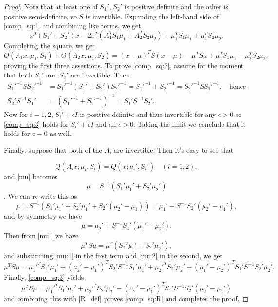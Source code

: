 \documentclass[12pt,leqno]{article}
\begin{document}
\begin{proof}
  Note that at least one of $S_1'$, $S_2'$ is positive definite and the other is positive semi-definite,
so $S$ is invertible.  Expanding the left-hand side of \eqref{comp_sq:1} and combining
like terms, we get
$$
x^T(S_1'+ S_2')x -2x^T(A_1^TS_1\mu_1+ A_2^TS_2\mu_2) 
+ \mu_1^TS_1\mu_1 + \mu_2^TS_2\mu_2.
$$
Completing the square, we get
$$
Q(A_1x;\mu_1,S_1) + Q(A_2x;\mu_2,S_2) = (x-\mu)^TS(x-\mu) -\mu^TS\mu + \mu_1^TS_1\mu_1 + \mu_2^TS_2\mu_2,
$$
proving the first three assertions.
To prove \eqref{comp_sq:3}, assume for the moment that both $S_1'$ and $S_2'$ are invertible.
Then
\begin{align*}
S_1'^{-1}SS_2'^{-1} &= S_1'^{-1}(S_1'+S_2')S_2'^{-1} = S_1'^{-1}+S_2'^{-1} = S_2'^{-1}SS_1'^{-1},\quad\text{hence}\\
S_2'S^{-1}S_1' &= (S_1'^{-1}+S_2'^{-1})^{-1} = S_1'S^{-1}S_2'.
\end{align*}
Now for $i = 1,2$, $S_i'+\epsilon{I}$ is positive definite and thus invertible for any $\epsilon > 0$
so \eqref{comp_sq:3} holds for $S_i'+\epsilon{I}$ and all $\epsilon > 0$.  Taking the limit
we conclude that it holds for $\epsilon = 0$ as well.

Finally, suppose that both of the $A_i$ are invertible. Then it's easy to see that

\begin{equation}\label{comp_sq:4}
Q(A_ix;\mu_i,S_i) = Q(x;\mu_i',S_i')\quad(i = 1,2),
\end{equation}
and \eqref{mu} becomes
\begin{equation} \label{mu'}
\mu = S^{-1}(S_1'\mu_1' + S_2'\mu_2')
\end{equation}.
We can re-write this as
\begin{equation}\label{mu:1}
\mu = S^{-1}(S_1'\mu_1' + S_2'\mu_1' + S_2'(\mu_2'-\mu_1)) = \mu_1' + S^{-1}S_2'(\mu_2'-\mu_1'),
\end{equation}
and by symmetry we have
\begin{equation}\label{mu:2}
  \mu = \mu_2' + S^{-1}S_1'(\mu_1'-\mu_2').
\end{equation}
Then from \eqref{mu'} we have
$$
\mu^TS\mu = \mu^T(S_1'\mu_1' + S_2'\mu_2'),
$$
and substituting \eqref{mu:1} in the first term and \eqref{mu:2} in the second, we get
$$
\mu^TS\mu = \mu_1'^TS_1'\mu_1' + (\mu_2'-\mu_1')^TS_2'S^{-1}S_1'\mu_1' + \mu_2'^TS_2'\mu_2'+(\mu_1'-\mu_2')^TS_1'S^{-1}S_2'\mu_2'.
$$
Finally, \eqref{comp_sq:3} yields
$$
\mu^TS\mu = \mu_1'^TS_1'\mu_1' + \mu_2'^TS_2'\mu_2' - (\mu_2'-\mu_1')^TS_1'S^{-1}S_2'(\mu_2'-\mu_1')
$$
and combining this with \eqref{R_def} proves \eqref{comp_sq:R} and completes the proof.
\end{proof}
\end{document}

